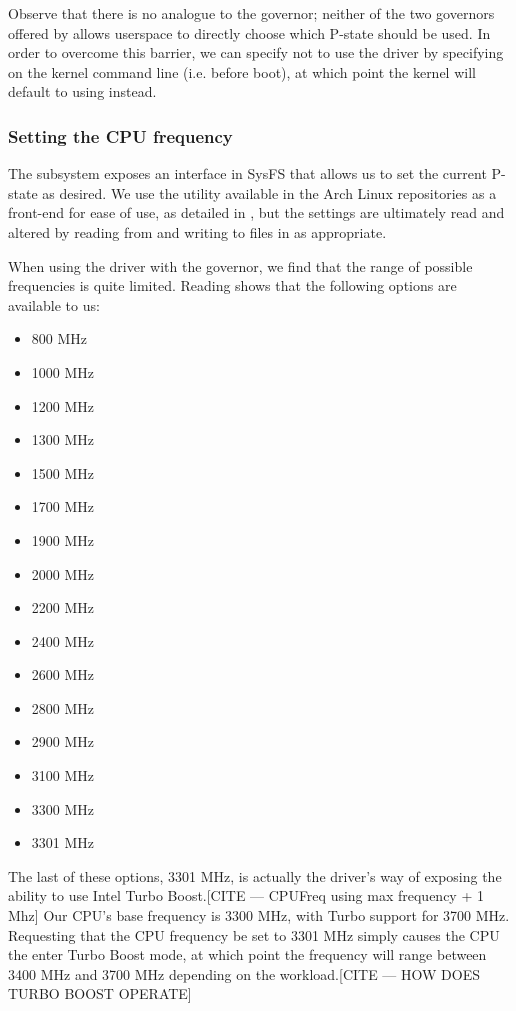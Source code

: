 Observe that there is no analogue to the  governor; neither of the
two governors offered by  allows userspace to directly choose
which P-state should be used. In order to overcome this barrier, we can specify
not to use the  driver by specifying  on
the kernel command line (i.e. before boot), at which point the kernel will
default to using  instead.

\subsubsection{Setting the CPU frequency}

The  subsystem exposes an interface in SysFS that allows us to set
the current P-state as desired. We use the  utility available in
the Arch Linux repositories as a front-end for ease of use, as detailed in
\cite{archFrequency}, but the settings are ultimately read and altered by
reading from and writing to files in  as appropriate.

When using the  driver with the  governor, we find that
the range of possible frequencies is quite limited. Reading  shows
that the following options are available to us:
\begin{itemize}
    \item 800 MHz
    \item 1000 MHz
    \item 1200 MHz
    \item 1300 MHz
    \item 1500 MHz
    \item 1700 MHz
    \item 1900 MHz
    \item 2000 MHz
    \item 2200 MHz
    \item 2400 MHz
    \item 2600 MHz
    \item 2800 MHz
    \item 2900 MHz
    \item 3100 MHz
    \item 3300 MHz
    \item 3301 MHz
\end{itemize}

The last of these options, 3301 MHz, is actually the driver's way of exposing
the ability to use Intel Turbo Boost.[CITE — CPUFreq using max frequency + 1 Mhz]
Our CPU's base frequency is 3300 MHz,
with Turbo support for 3700 MHz. Requesting that the CPU frequency be set to
3301 MHz simply causes the CPU the enter Turbo Boost mode, at which point the
frequency will range between 3400 MHz and 3700 MHz depending on the
workload.[CITE — HOW DOES TURBO BOOST OPERATE]
